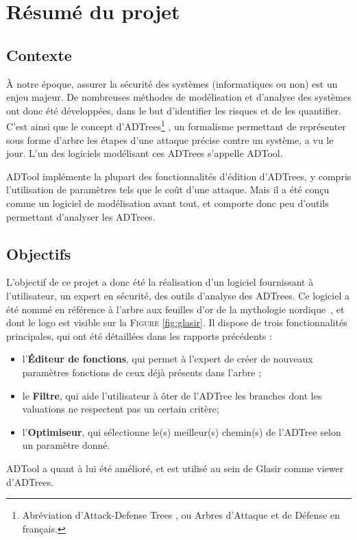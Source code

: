 \section{Résumé du projet}
\label{sec:sumup}

\subsection{Contexte}
\label{ssec:contexte}

    À notre époque, assurer la sécurité des systèmes (informatiques ou non) est un enjeu majeur. De nombreuses méthodes de modélisation et d'analyse des systèmes ont donc été développées, dans le but d'identifier les risques et de les quantifier. C'est ainsi que le concept d'ADTrees\footnote{Abréviation d'\og Attack-Defense Trees \fg{}, ou \og Arbres d'Attaque et de Défense\fg{} en français.}
		, un formalisme permettant de représenter sous forme d'arbre les étapes d'une attaque précise contre un système, a vu le jour. L'un des logiciels modélisant ces ADTrees s'appelle ADTool.

    ADTool implémente la plupart des fonctionnalités d'édition d'ADTrees, y compris l'utilisation de paramètres tels que le coût d'une attaque. Mais il a été conçu comme un logiciel de modélisation avant tout, et comporte donc peu d'outils permettant d'analyser les ADTrees.

\subsection{Objectifs}
\label{ssec:objectifs}

    L'objectif de ce projet a donc été la réalisation d'un logiciel fournissant à l'utilisateur, un expert en sécurité, des outils d'analyse des ADTrees. Ce logiciel a été nommé \glasir{} en référence à l'arbre aux feuilles d'or de la mythologie nordique~\cite{vikingCulture}, et dont le logo est visible sur la \textsc{Figure} \ref{fig:glasir}. Il dispose de trois fonctionnalités principales, qui ont été détaillées dans les rapports précédents :
\begin{itemize}
    	\item l'{\bf Éditeur de fonctions}, qui permet à l'expert de créer de nouveaux paramètres fonctions de ceux déjà présents dans l'arbre ;
    	\item le {\bf Filtre}, qui aide l'utilisateur à ôter de l'ADTree les branches dont les valuations ne respectent pas un certain critère;
    	\item l'{\bf Optimiseur}, qui sélectionne le(s) meilleur(s) chemin(s) de l'ADTree selon un paramètre donné.
\end{itemize} 
    ADTool a quant à lui été amélioré, et est utilisé au sein de Glasir comme viewer d'ADTrees. 

